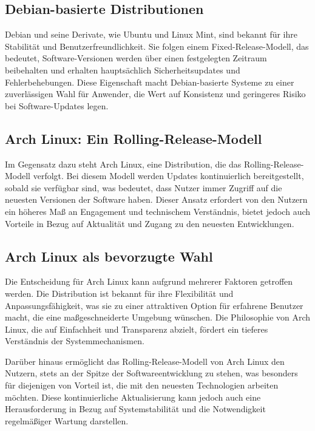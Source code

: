 \subsection{Debian-basierte Distributionen}

Debian und seine Derivate, wie Ubuntu und Linux Mint, sind bekannt für ihre
Stabilität und Benutzerfreundlichkeit. Sie folgen einem Fixed-Release-Modell,
das bedeutet, Software-Versionen werden über einen festgelegten Zeitraum
beibehalten und erhalten hauptsächlich Sicherheitsupdates und Fehlerbehebungen.
Diese Eigenschaft macht Debian-basierte Systeme zu einer zuverlässigen Wahl für
Anwender, die Wert auf Konsistenz und geringeres Risiko bei Software-Updates
legen.

\subsection{Arch Linux: Ein Rolling-Release-Modell}

Im Gegensatz dazu steht Arch Linux, eine Distribution, die das
Rolling-Release-Modell verfolgt. Bei diesem Modell werden Updates kontinuierlich
bereitgestellt, sobald sie verfügbar sind, was bedeutet, dass Nutzer immer
Zugriff auf die neuesten Versionen der Software haben. Dieser Ansatz erfordert
von den Nutzern ein höheres Maß an Engagement und technischem Verständnis,
bietet jedoch auch Vorteile in Bezug auf Aktualität und Zugang zu den neuesten
Entwicklungen.

\newpage
\subsection{Arch Linux als bevorzugte Wahl}

Die Entscheidung für Arch Linux kann aufgrund mehrerer Faktoren getroffen
werden. Die Distribution ist bekannt für ihre Flexibilität und
Anpassungsfähigkeit, was sie zu einer attraktiven Option für erfahrene Benutzer
macht, die eine maßgeschneiderte Umgebung wünschen. Die Philosophie von Arch
Linux, die auf Einfachheit und Transparenz abzielt, fördert ein tieferes
Verständnis der Systemmechanismen.

Darüber hinaus ermöglicht das Rolling-Release-Modell von Arch Linux den Nutzern,
stets an der Spitze der Softwareentwicklung zu stehen, was besonders für
diejenigen von Vorteil ist, die mit den neuesten Technologien arbeiten möchten.
Diese kontinuierliche Aktualisierung kann jedoch auch eine Herausforderung in
Bezug auf Systemstabilität und die Notwendigkeit regelmäßiger Wartung darstellen.

